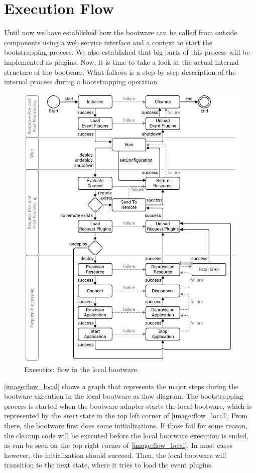 \section{Execution Flow}
\label{design:flow}

Until now we have established how the bootware can be called from outside components using a web service interface and a context to start the bootstrapping process.
We also established that big parts of this process will be implemented as plugins.
Now, it is time to take a look at the actual internal structure of the bootware.
What follows is a step by step description of the internal process during a bootstrapping operation.

\begin{figure}[!htbp]
	\centering
	\includegraphics[resolution=600]{design/assets/flow_local}
	\caption{Execution flow in the local bootware.}
	\label{image:flow_local}
\end{figure}

\autoref{image:flow_local} shows a graph that represents the major steps during the bootware execution in the local bootware as flow diagram.
The bootstrapping process is started when the bootware adapter starts the local bootware, which is represented by the \textit{start} state in the top left corner of \autoref{image:flow_local}.
From there, the bootware first does some initializations.
If those fail for some reason, the cleanup code will be executed before the local bootware execution is ended, as can be seen on the top right corner of \autoref{image:flow_local}.
In most cases however, the initialization should succeed.
Then, the local bootware will transition to the next state, where it tries to load the event plugins.

